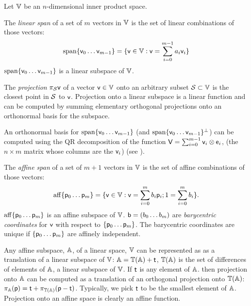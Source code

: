 \label{sec:spans-and-projections}

Let $\mathbb{V}$ be an $n$-dimensional inner product space.

The \textit{linear span} of a set of $m$ vectors in $\mathbb{V}$
is the set of linear combinations of those vectors:
\begin{equation}
\mathrm{span}\{ \mathsf{v}_0 \ldots \mathsf{v}_{m-1} \} = \{\mathsf{v} \in \mathbb{V} : \mathsf{v} = \sum_{i=0}^{m-1} a_i \mathsf{v}_i\}
\end{equation}
$\mathrm{span}\{ \mathsf{v}_0 \ldots \mathsf{v}_{m-1} \}$ is a linear subspace of $\mathbb{V}$.

The \textit{projection} $\pi_{\mathcal{S}} \mathsf{v}$ of a vector $\mathsf{v} \in \mathbb{V}$
onto an arbitrary subset $\mathcal{S} \subset \mathbb{V}$
is the closest point in $\mathcal{S}$ to $\mathsf{v}$.
Projection onto a linear subspace is a linear function and
can be computed by summing
elementary orthogonal projections onto an orthonormal basis for the subspace.

An orthonormal basis for $\mathrm{span}\{ \mathsf{v}_0 \ldots \mathsf{v}_{m-1} \}$
(and $\mathrm{span}\{ \mathsf{v}_0 \ldots \mathsf{v}_{m-1} \}^\perp$)
can be computed using the QR decomposition
of the function $\mathsf{V} = \sum_{i=0}^{m-1} \mathsf{v}_i \otimes \mathsf{e}_i$,
(the $n \times m$ matrix whose columns are the $\mathsf{v}_i$)
(see \cite[sec.~5.2 ]{golub-vanloan-2012}).

The \textit{affine span} of a set of $m+1$ vectors in $\mathbb{V}$
is the set of affine combinations of those vectors:
\begin{equation}
\mathrm{aff}\{ \mathsf{p}_0 \ldots \mathsf{p}_{m} \} = \{\mathsf{v} \in \mathbb{V} : \mathsf{v} = \sum_{i=0}^{m} b_i \mathsf{p}_i;
1 = \sum_{i=0}^{m} b_i \}.
\end{equation}
$\mathrm{aff}\{ \mathsf{p}_0 \ldots \mathsf{p}_{m} \}$ is an affine subspace of $\mathbb{V}$.
$\mathsf{b} = ( b_0 \ldots b_m )$ are \textit{barycentric coordinates}
for $\mathsf{v}$ with respect to $\{ \mathsf{p}_0 \ldots \mathsf{p}_{m} \}$.
The barycentric coordinates are unique if $\{ \mathsf{p}_0 \ldots \mathsf{p}_{m} \}$
are affinely independent.

Any affine subspace, $\mathbb{A}$, of a linear space, $\mathbb{V}$ can be represented as
as a translation of a linear subspace of $\mathbb{V}$:
$\mathbb{A} = \mathbb{T}(\mathbb{A}) + \mathsf{t}$,
$\mathbb{T}(\mathbb{A})$ is the set of differences of elements of $\mathbb{A}$,
a linear subspace of $\mathbb{V}$.
If $\mathsf{t}$ is any element of $\mathbb{A}$.
then projection onto $\mathbb{A}$
can be computed as a translation of an orthogonal projection onto $\mathbb{T}(\mathbb{A})$:
$\pi_{\mathbb{A}} (\mathsf{p}) = \mathsf{t} + \pi_{\mathbb{T}(\mathbb{A})} (\mathsf{p} - \mathsf{t})$.
Typically, we pick $\mathsf{t}$ to be the smallest element of $\mathbb{A}$.
Projection onto an affine space is clearly an affine function.

